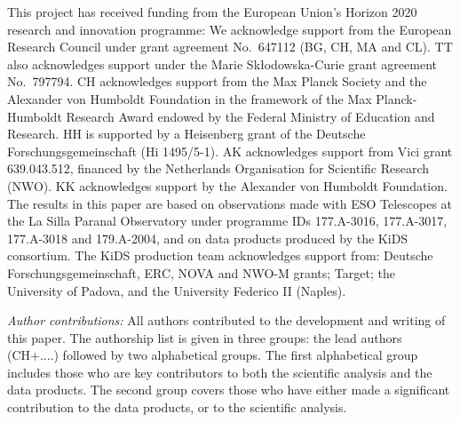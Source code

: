 \documentclass[letter]{aa}
\begin{document}
\begin{acknowledgements}

This project has received funding from the European Union's Horizon 2020 research and innovation programme: We acknowledge support from the European Research Council under grant agreement No.~647112 (BG, CH, MA and CL). TT also acknowledges support under the Marie Sk\l{}odowska-Curie grant agreement No.~797794. CH acknowledges support from the Max Planck Society and the Alexander von Humboldt Foundation in the framework of the Max Planck-Humboldt Research Award endowed by the Federal Ministry of Education and Research. HH is supported by a Heisenberg grant of the Deutsche Forschungsgemeinschaft (Hi 1495/5-1). AK acknowledges support from Vici grant 639.043.512, financed by the Netherlands Organisation for Scientific Research (NWO). KK acknowledges support by the Alexander von Humboldt Foundation.\\

%
The results in this paper are based on observations made with ESO Telescopes at the La Silla Paranal Observatory under programme IDs 177.A-3016, 177.A-3017, 177.A-3018 and 179.A-2004, and on data products produced by the KiDS consortium. The KiDS production team acknowledges support from: Deutsche Forschungsgemeinschaft, ERC, NOVA and NWO-M grants; Target; the University of Padova, and the University Federico II (Naples).

{ {\it Author contributions:}  All authors contributed to the development and writing of this paper.  The authorship list is given in three groups:  the lead authors (CH+....) followed by two alphabetical groups.  The first alphabetical group includes those who are key contributors to both the scientific analysis and the data products.  The second group covers those who have either made a significant contribution to the data products, or to the scientific analysis.}
\end{acknowledgements}




\end{document}

